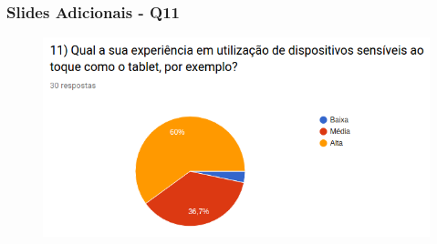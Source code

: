 \begin{frame}
\frametitle{Slides Adicionais - Q11}
\begin{figure}
\centering
\includegraphics[scale=0.45]{figuras/q11.png}
\end{figure}
\end{frame}